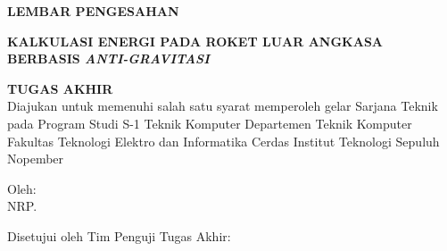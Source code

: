\begin{center}
  \large
  \textbf{LEMBAR PENGESAHAN}
\end{center}

\thispagestyle{empty}

\begin{center}
  \textbf{KALKULASI ENERGI PADA ROKET LUAR ANGKASA BERBASIS \emph{ANTI-GRAVITASI}}
\end{center}

\begingroup
\small

\begin{center}
  \textbf{TUGAS AKHIR}
  \\Diajukan untuk memenuhi salah satu syarat memperoleh gelar Sarjana Teknik pada Program Studi S-1 Teknik Komputer Departemen Teknik Komputer Fakultas Teknologi Elektro dan Informatika Cerdas Institut Teknologi Sepuluh Nopember
\end{center}

\begin{center}
  Oleh: \name{}
  \\NRP. \nrp{}
\end{center}

\begin{center}
  Disetujui oleh Tim Penguji Tugas Akhir:
\end{center}

\begingroup
\setlength{\tabcolsep}{0pt}

